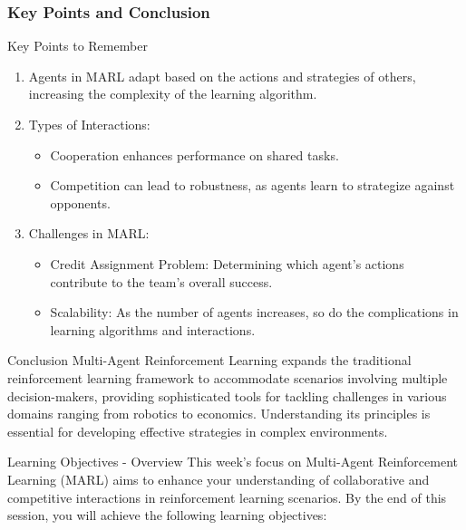 \documentclass[aspectratio=169]{beamer}
\begin{document}
\begin{frame}[fragile]
    \frametitle{Key Points and Conclusion}
    \begin{block}{Key Points to Remember}
        \begin{enumerate}
            \item Agents in MARL adapt based on the actions and strategies of others, increasing the complexity of the learning algorithm.
            \item Types of Interactions:
            \begin{itemize}
                \item Cooperation enhances performance on shared tasks.
                \item Competition can lead to robustness, as agents learn to strategize against opponents.
            \end{itemize}
            \item Challenges in MARL:
            \begin{itemize}
                \item Credit Assignment Problem: Determining which agent's actions contribute to the team's overall success.
                \item Scalability: As the number of agents increases, so do the complications in learning algorithms and interactions.
            \end{itemize}
        \end{enumerate}
    \end{block}
    \begin{block}{Conclusion}
        Multi-Agent Reinforcement Learning expands the traditional reinforcement learning framework to accommodate scenarios involving multiple decision-makers, providing sophisticated tools for tackling challenges in various domains ranging from robotics to economics. Understanding its principles is essential for developing effective strategies in complex environments.
    \end{block}
\end{frame}

\begin{frame}[fragile]{Learning Objectives - Overview}
    This week's focus on Multi-Agent Reinforcement Learning (MARL) aims to enhance your understanding of collaborative and competitive interactions in reinforcement learning scenarios. By the end of this session, you will achieve the following learning objectives:
\end{frame}
\end{document}
